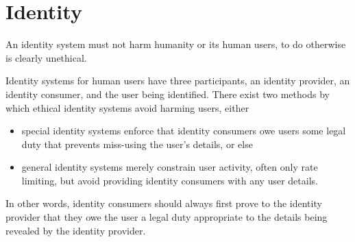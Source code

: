 
\section{Identity}












An identity system must not harm humanity or its human users, to do otherwise is clearly unethical.  

Identity systems for human users have three participants, an identity provider, an identity consumer, and the user being identified.  There exist two methods by which ethical identity systems avoid harming users, either 
\begin{itemize}
\item special identity systems enforce that identity consumers owe users some legal duty that prevents miss-using the user's details, or else
\item general identity systems merely constrain user activity, often only rate limiting, but avoid providing identity consumers with any user details.
\end{itemize}
In other words, identity consumers should always first prove to the identity provider that they owe the user a legal duty appropriate to the details being revealed by the identity provider.

